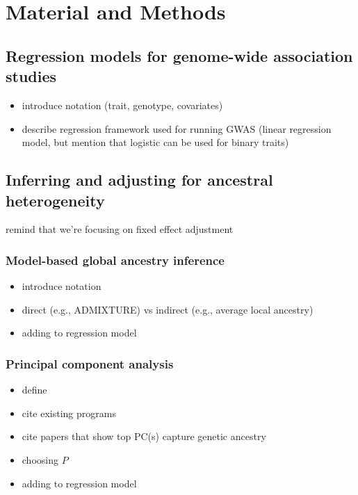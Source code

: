 \documentclass[12pt]{article}
\begin{document}
\section{Material and Methods}


\subsection{Regression models for genome-wide association studies}

\begin{itemize}
\item introduce notation (trait, genotype, covariates)
\item describe regression framework used for running GWAS (linear regression model, but mention that logistic can be used for binary traits)
\end{itemize}

\subsection{Inferring and adjusting for ancestral heterogeneity}

remind that we're focusing on fixed effect adjustment

\subsubsection{Model-based global ancestry inference}

\begin{itemize}
\item introduce notation
\item direct (e.g., ADMIXTURE) vs indirect (e.g., average local ancestry)
\item adding to regression model
\end{itemize}

\subsubsection{Principal component analysis}

\begin{itemize}
\item define
\item cite existing programs
\item cite papers that show top PC(s) capture genetic ancestry
\item choosing $P$
\item adding to regression model
\end{itemize}
\end{document}
